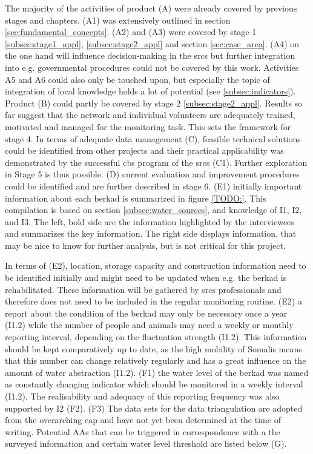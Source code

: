 The majority of the activities of product (A) were already covered by previous stages and chapters. (A1) was extensively outlined in section \ref*{sec:fundamental_concepts}. (A2) and (A3) were covered by stage 1 \ref*{subsec:stage1_appl}, \ref*{subsec:stage2_appl} and section \ref*{sec:case_area}. (A4) on the one hand will influence decision-making in the \acrshort{srcs} but further integration into e.g. governmental procedures could not be covered by this work. Activities A5 and A6 could also only be touched upon, but especially the topic of integration of local knowledge holds a lot of potential (see \ref*{subsec:indicators}).\newline
Product (B) could partly be covered by stage 2 \ref*{subsec:stage2_appl}. Results so far suggest that the network and individual volunteers are adequately trained, motivated and managed for the monitoring task. This sets the framework for stage 4. In terms of adequate data management (C), feasible technical solutions could be identified from other projects and their practical applicability was demonstrated by the successful \acrshort{cbs} program of the \acrshort{srcs} (C1). Further exploration in Stage 5 is thus possible. (D) current evaluation and improvement procedures could be identified and are further described in stage 6.\newline
(E1) initially important information about each berkad is summarized in figure \ref*{TODO:}. This compilation is based on section \ref*{subsec:water_sources}, and knowledge of I1, I2, and I3. The left, bold side are the information highlighted by the interviewees and summarizes the key information. The right side displays information, that may be nice to know for further analysis, but is not critical for this project.


In terms of (E2), location, storage capacity and construction information need to be identified initially and might need to be updated when e.g. the berkad is rehabilitated. These information will be gathered by \acrshort{srcs} professionals and therefore does not need to be included in the regular monitoring routine. (E2) a report about the condition of the berkad may only be necessary once a year (I1.2) while the number of people and animals may need a weekly or monthly reporting interval, depending on the fluctuation strength (I1.2). This information should be kept comparatively up to date, as the high mobility of Somalis means that this number can change relatively regularly and has a great influence on the amount of water abstraction (I1.2).\newline
(F1) the water level of the berkad was named as constantly changing indicator which should be monitored in a weekly interval (I1.2). The realisability and adequacy of this reporting frequency was also supported by I2 (F2). (F3) The data sets for the data triangulation are adopted from the overarching \acrshort{eap} and have not yet been determined at the time of writing.\newline
Potential AAs that can be triggered in correspondence with a the surveyed information and certain water level threshold are listed below (G). 

